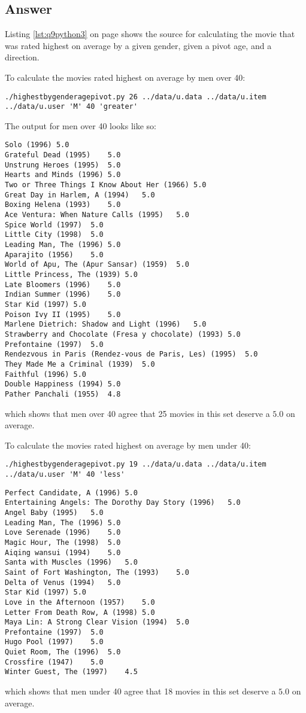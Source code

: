 \documentclass[letterpaper,11pt]{article}
\begin{document}
\subsection*{Answer}

Listing \ref{lst:q9python3} on page \pageref{lst:q9python3} shows the source for calculating the movie that was rated highest on average by a given gender, given a pivot age, and a direction.

To calculate the movies rated highest on average by men over 40:
\begin{lstlisting}[frame=single]
./highestbygenderagepivot.py 26 ../data/u.data ../data/u.item ../data/u.user 'M' 40 'greater'
\end{lstlisting}

The output for men over 40 looks like so:
\begin{lstlisting}
Solo (1996)	5.0
Grateful Dead (1995)	5.0
Unstrung Heroes (1995)	5.0
Hearts and Minds (1996)	5.0
Two or Three Things I Know About Her (1966)	5.0
Great Day in Harlem, A (1994)	5.0
Boxing Helena (1993)	5.0
Ace Ventura: When Nature Calls (1995)	5.0
Spice World (1997)	5.0
Little City (1998)	5.0
Leading Man, The (1996)	5.0
Aparajito (1956)	5.0
World of Apu, The (Apur Sansar) (1959)	5.0
Little Princess, The (1939)	5.0
Late Bloomers (1996)	5.0
Indian Summer (1996)	5.0
Star Kid (1997)	5.0
Poison Ivy II (1995)	5.0
Marlene Dietrich: Shadow and Light (1996) 	5.0
Strawberry and Chocolate (Fresa y chocolate) (1993)	5.0
Prefontaine (1997)	5.0
Rendezvous in Paris (Rendez-vous de Paris, Les) (1995)	5.0
They Made Me a Criminal (1939)	5.0
Faithful (1996)	5.0
Double Happiness (1994)	5.0
Pather Panchali (1955)	4.8
\end{lstlisting}
which shows that men over 40 agree that 25 movies in this set deserve a $5.0$ on average.

To calculate the movies rated highest on average by men under 40:
\begin{lstlisting}[frame=single]
./highestbygenderagepivot.py 19 ../data/u.data ../data/u.item ../data/u.user 'M' 40 'less'
\end{lstlisting}

\begin{lstlisting}[frame=single]
Perfect Candidate, A (1996)	5.0
Entertaining Angels: The Dorothy Day Story (1996)	5.0
Angel Baby (1995)	5.0
Leading Man, The (1996)	5.0
Love Serenade (1996)	5.0
Magic Hour, The (1998)	5.0
Aiqing wansui (1994)	5.0
Santa with Muscles (1996)	5.0
Saint of Fort Washington, The (1993)	5.0
Delta of Venus (1994)	5.0
Star Kid (1997)	5.0
Love in the Afternoon (1957)	5.0
Letter From Death Row, A (1998)	5.0
Maya Lin: A Strong Clear Vision (1994)	5.0
Prefontaine (1997)	5.0
Hugo Pool (1997)	5.0
Quiet Room, The (1996)	5.0
Crossfire (1947)	5.0
Winter Guest, The (1997)	4.5
\end{lstlisting}
which shows that men under 40 agree that 18 movies in this set deserve a $5.0$ on average.
\end{document}
